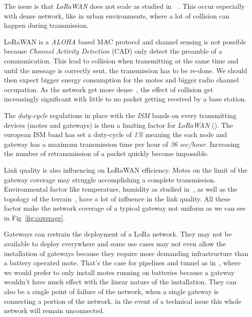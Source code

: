 

The issue is that \emph{LoRaWAN} does not scale as studied 
in~\cite{8030482}~\cite{10.1145/2988287.2989163}. This occur especially 
with dense network, like in urban environments, where a lot of collision can
happen during transmission.

LoRaWAN is a \emph{ALOHA} based MAC protocol and channel sensing is not possible 
because \emph{Channel Activity Detection} (CAD) only detect the preamble of a 
communication. %
This lead to collision when transmitting at the same time and until the message 
is correctly sent, the transmission has to be re-done.
We should then expect bigger energy consumption for the motes and bigger radio 
channel occupation.
As the network get more dense~\cite{8030482}, the effect of collision get 
increasingly significant with little to no packet getting received by a base
station.

The \emph{duty-cycle} regulations in place with the \emph{ISM} bands on every
transmitting devices (motes and gateways) is then a limiting factor 
for \emph{LoRaWAN} (\cite{8030482}).
The european ISM band has set a duty-cycle of \emph{1\%} meaning the each node 
and gateway has a maximum transmission time per hour of \emph{36 sec/hour}. 
Increasing the number of retransmission of a packet quickly become impossible.

Link quality is also influencing on LoRaWAN efficiency. 
Motes on the limit of the gateway coverage may struggle accomplishing a 
complete transmission. 
Environmental factor like temperature, humidity as studied 
in~\cite{evaluation_of_the_reliability_of_lora}, as well as the topology of the 
terrain~\cite{lorajambalaya}, have a lot of influence in the link quality.
All these factor make the network coverage of a typical gateway not uniform 
as we can see in Fig~\ref{fig:coverage}.

Gateways can restrain the deployment of a LoRa network.
They may not be available to deploy everywhere and some use cases may not even allow
the installation of gateways because they require more demanding infrastructure 
than a battery operated mote.
That's the case for pipelines and tunnel as in~\cite{Abrardo_2019},
where we would prefer to only install motes running on batteries because a
gateway wouldn't have much effect with the linear nature of the installation.
They can also be a single point of failure of the network, when a single
gateway is connecting a portion of the network, in the event of a technical
issue this whole network will remain unconnected.

